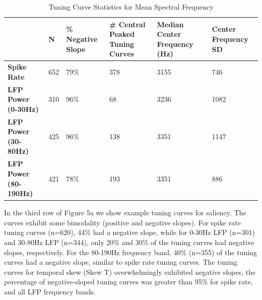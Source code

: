 \begin{table}
\begin{center}
\begin{tabular}{|p{2.4cm}|p{2.4cm}|p{2.4cm}|p{2.4cm}|p{2.4cm}|p{2.2cm} |}
\hline
 & \textbf{N} & \textbf{\% Negative Slope} &
\textbf{\# Central Peaked Tuning Curves} & \textbf{Median Center Frequency (Hz)} &
\textbf{Center Frequency SD} \\
\hline 
\textbf{Spike Rate} & 652 & 79\% & 378 & 3155 & 746 \\
\hline 
\textbf{LFP Power (0-30Hz)} & 310 & 96\% & 68 & 3236 & 1082 \\
\hline 
\textbf{LFP Power (30-80Hz)} & 425 & 96\% & 138 & 3351 & 1147 \\
\hline 
\textbf{LFP Power (80-190Hz)} & 421 & 78\% & 193 & 3351 & 886\\
\hline
\end{tabular}
\end{center}
\caption{Tuning Curve Statistics for Mean Spectral Frequency}
\end{table}

In the third row of Figure 5a we show example tuning curves for saliency. The curves exhibit some bimodality (positive and negative slopes). For spike rate tuning curves (n=620), 44\% had a negative slope, while for 0-30Hz LFP (n=301) and 30-80Hz LFP (n=344), only 20\%  and 30\% of the tuning curves had negative slopes, respectively.  For the 80-190Hz frequency band, 40\% (n=355) of the tuning curves had a negative slope, similar to spike rate tuning curves. The tuning curves for temporal skew (Skew T) overwhelmingly exhibited negative slopes, the percentage of negative-sloped tuning curves was greater than 95\% for spike rate, and all LFP frequency bands.

